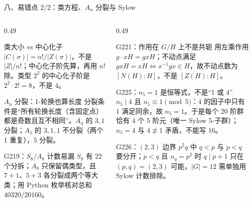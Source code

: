 \documentclass[aspectratio=169,10pt,fontset=none]{ctexbeamer}
\begin{document}
\begin{frame}[t]{八、易错点 2/2：类方程、$A_n$ 分裂与 Sylow}
  \begin{columns}[T,onlytextwidth]
    \begin{column}{0.49\textwidth}
      \begin{alertblock}{\footnotesize 类大小 vs 中心化子}
        \scriptsize
        $|C(\sigma)|=n!/|Z(\sigma)|$，不是 $|Z|/n!$；中心化子阶先算，再用 $n!$ 除。类型 $2^2$ 的中心化子阶是 $2^2\cdot2!=8$，不是 4。
      \end{alertblock}
      \begin{alertblock}{\footnotesize $A_n$ 分裂：1-轮换也算长度}
        \scriptsize
        分裂条件是“所有轮换长度（含固定点）都是奇数且互不相同”。$A_4$ 的 $3,1$ 分裂；$A_5$ 的 $3,1,1$ 不分裂（两个 1 重复），$5$ 分裂。
      \end{alertblock}
      \begin{alertblock}{\footnotesize G219：$S_8/A_8$ 计数易漏}
        \scriptsize
        $S_8$ 有 22 个分拆；$A_8$ 只保留偶类型，且 $7+1$、$5+3$ 各分裂成两个等大类；用 Python 枚举核对总和 $40320/20160$。
      \end{alertblock}
    \end{column}
    \begin{column}{0.49\textwidth}
      \begin{alertblock}{\footnotesize G221：作用在 $G/H$ 上不是共轭}
        \scriptsize
        用左乘作用 $g\cdot xH=gxH$；不动点满足 $gxH=xH\iff x^{-1}gx\in H$，故不动点数为 $[N(H):H]$，不是 $[Z(H):H]$。
      \end{alertblock}
      \begin{alertblock}{\footnotesize G225：$n_5=1$ 是恒等式，不是“1 或 4”}
        \scriptsize
        $n_5\mid4$ 且 $n_5\equiv1\pmod5$：$4$ 的因子中只有 $1$ 满足同余，故 $n_5=1$。于是每个 20 阶群恰有 $4$ 个 5 阶元（唯一 Sylow 5-子群）；$n_5=4$ 与 $4\not\equiv1$ 矛盾，不能写 16。
      \end{alertblock}
      \begin{alertblock}{\footnotesize G226：$(2,3)$ 边界}
        \scriptsize
        $p^2q$ 中 $q<p$ 与 $p<q$ 要分开；$p<q$ 且 $n_q=p^2$ 时 $q\mid p+1$ 只在 $(p,q)=(2,3)$ 可能，$|G|=12$ 需单独用 Sylow 计数排除。
      \end{alertblock}
    \end{column}
  \end{columns}
\end{frame}
\end{document}
